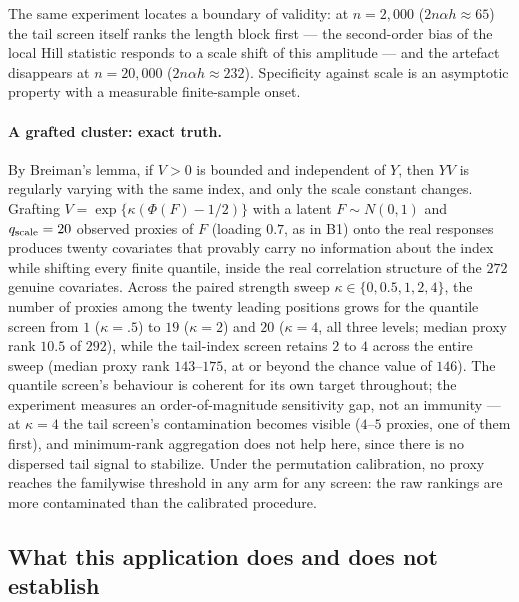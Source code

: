 The same experiment locates a boundary of validity: at $n=2{,}000$
($2n\alpha h\approx65$) the tail screen itself ranks the length block
first --- the second-order bias of the local Hill statistic responds to
a scale shift of this amplitude --- and the artefact disappears at
$n=20{,}000$ ($2n\alpha h\approx232$). Specificity against scale is an
asymptotic property with a measurable finite-sample onset.

\paragraph{A grafted cluster: exact truth.}
By Breiman's lemma, if $V>0$ is bounded and independent of $Y$, then
$YV$ is regularly varying with the same index, and only the scale
constant changes. Grafting
$V=\exp\{\kappa(\Phi(F)-1/2)\}$ with a latent $F\sim N(0,1)$ and
$q_{\rm scale}=20$ observed proxies of $F$ (loading $0.7$, as in B1)
onto the real responses produces twenty covariates that provably carry
no information about the index while shifting every finite quantile,
inside the real correlation structure of the $272$ genuine covariates.
Across the paired strength sweep $\kappa\in\{0,0.5,1,2,4\}$, the number
of proxies among the twenty leading positions grows for the quantile
screen from $1$ ($\kappa=.5$) to $19$ ($\kappa=2$) and $20$
($\kappa=4$, all three levels; median proxy rank $10.5$ of $292$),
while the tail-index screen retains $2$ to $4$ across the entire sweep
(median proxy rank $143$--$175$, at or beyond the chance value of
$146$). The quantile screen's behaviour is coherent for its own target
throughout; the experiment measures an order-of-magnitude sensitivity
gap, not an immunity --- at $\kappa=4$ the tail screen's contamination
becomes visible ($4$--$5$ proxies, one of them first), and minimum-rank
aggregation does not help here, since there is no dispersed tail signal
to stabilize. Under the permutation calibration, no proxy reaches the
familywise threshold in any arm for any screen: the raw rankings are
more contaminated than the calibrated procedure.

\subsection{What this application does and does not establish}

